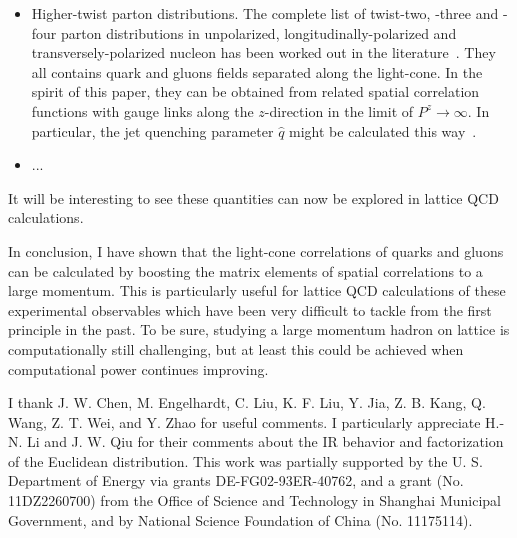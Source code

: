 \documentclass[aps,prd,preprint,tightenlines,superscriptaddress]{revtex4}
\begin{document}
\begin{itemize}
\item{Higher-twist parton distributions. The complete list of twist-two, -three and -four parton
distributions in unpolarized, longitudinally-polarized and transversely-polarized nucleon has been
worked out in the literature~\cite{Ellis:1982cd}. They all contains quark and gluons fields separated
along the light-cone. In the spirit of this paper, they can be obtained from related spatial correlation
functions with gauge links along the $z$-direction in the limit of $P^z \rightarrow \infty$. In particular, the
jet quenching parameter $\hat q$ might be calculated this way~\cite{Majumder:2012sh}.}

\item{...}

\end{itemize}
It will be interesting to see these quantities can now be explored in lattice QCD calculations.

In conclusion, I have shown that the light-cone correlations of quarks and gluons
can be calculated by boosting the matrix elements
of spatial correlations to a large momentum. This is particularly
useful for lattice QCD calculations of these experimental observables
which have been very difficult to tackle from the first principle in the past.
To be sure, studying a large momentum hadron on lattice is computationally
still challenging, but at least this could be achieved when computational power continues
improving.

I thank J. W. Chen, M. Engelhardt, C. Liu, K. F. Liu, Y. Jia, Z. B. Kang, Q. Wang, Z. T. Wei, and Y. Zhao for useful
comments. I particularly appreciate H.-N. Li and J. W. Qiu for their comments about the IR behavior and
factorization of the Euclidean distribution. This work was partially supported by the U.
S. Department of Energy via grants DE-FG02-93ER-40762, and a grant (No. 11DZ2260700) from the Office of
Science and Technology in Shanghai Municipal Government, and by National Science Foundation of China (No. 11175114).
\end{document}
